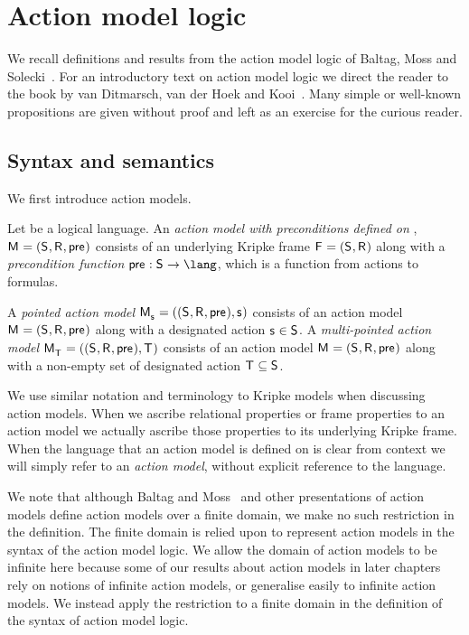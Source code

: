 \section{Action model logic}\label{aml}

We recall definitions and results from the action model logic of Baltag, Moss and Solecki~\cite{baltag:1998,baltag:2004}.
For an introductory text on action model logic we direct the reader to the book by van Ditmarsch, van der Hoek and Kooi~\cite{vanditmarsch:2007}.
Many simple or well-known propositions are given without proof and left as an exercise for the curious reader.

\subsection{Syntax and semantics}

We first introduce action models.

\begin{definition}
Let \lang{} be a logical language.
An {\em action model with preconditions defined on \lang{}}, $\aModelAndTuple$ consists of an underlying Kripke frame $\aFrameAndTuple$ along with a {\em precondition function} $\aPrecondition : \aStates \to \lang$, which is a function from actions to formulas.

A {\em pointed action model} $\aPModelAndTuple{\aStateS}$ consists of an action model $\aModelAndTuple$ along with a designated action $\aStateS \in \aStates$.
A {\em multi-pointed action model} $\aPModelAndTuple{\aStatesT}$ consists of an action model $\aModelAndTuple$ along with a non-empty set of designated action $\aStatesT \subseteq \aStates$.
\end{definition}

We use similar notation and terminology to Kripke models when discussing action models.
When we ascribe relational properties or frame properties to an action model we actually ascribe those properties to its underlying Kripke frame.
When the language that an action model is defined on is clear from context we will simply refer to an {\em action model}, without explicit reference to the language.

We note that although Baltag and Moss~\cite{baltag:2004} and other presentations of action models define action models over a finite domain, we make no such restriction in the definition.
The finite domain is relied upon to represent action models in the syntax of the action model logic.
We allow the domain of action models to be infinite here because some of our results about action models in later chapters rely on notions of infinite action models, or generalise easily to infinite action models.
We instead apply the restriction to a finite domain in the definition of the syntax of action model logic.

